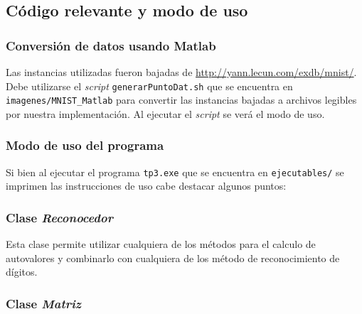 \subsection{C\'odigo relevante y modo de uso}

	\subsubsection{Conversi\'on de datos usando Matlab}
		Las instancias utilizadas fueron bajadas de \url{http://yann.lecun.com/exdb/mnist/}.
		Debe utilizarse el \textit{script} \texttt{generarPuntoDat.sh} que se
		encuentra en \texttt{imagenes/MNIST_Matlab}
		para convertir las instancias bajadas a archivos legibles por
		nuestra implementaci\'on. Al ejecutar el \textit{script} se
		ver\'a el modo de uso.

	\subsubsection{Modo de uso del programa}
		Si bien al ejecutar el programa \texttt{tp3.exe} que se encuentra
		en \texttt{ejecutables/} se imprimen las instrucciones de uso
		cabe destacar algunos puntos:

	\subsubsection{Clase \textit{Reconocedor}}
		Esta clase permite utilizar cualquiera de los m\'etodos para el calculo
		de autovalores y combinarlo con cualquiera de los m\'etodo de reconocimiento
		de d\'igitos.
		
		

	\subsubsection{Clase \textit{Matriz}}

		
